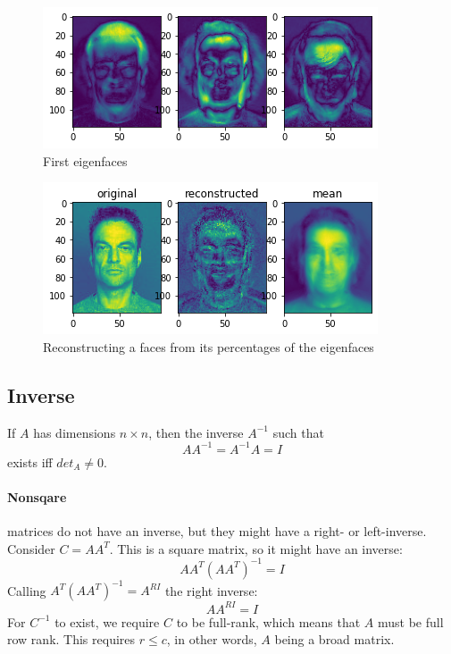 \begin{figure}[H]
    \caption{First eigenfaces}
    \centering
    \includegraphics[width=0.75\linewidth]{images/eigenface1.png}
\end{figure}

\begin{figure}[H]
    \caption{Reconstructing a faces from its percentages of the eigenfaces}
    \centering
    \includegraphics[width=0.75\linewidth]{images/eigenface_reconstructed.png}
\end{figure}







\subsection{Inverse}

If $A$ has dimensions $n \times n$, then the inverse $A^{-1}$ such that
$$ A A^{-1} = A^{-1} A = I $$
exists iff $det_A \neq 0$.

\paragraph{Nonsqare} matrices do not have an inverse, but they might have a right- or left-inverse.
Consider $C = A A^T$. This is a square matrix, so it might have an inverse:
$$ A A^T (A A^T)^{-1} = I $$
Calling $A^T (A A^T)^{-1} = A^{RI}$ the right inverse:
$$ A A^{RI} = I $$
For $C^{-1}$ to exist, we require $C$ to be full-rank, which means that $A$ must be full row rank. This  requires $r \leq c$, in other words, $A$ being a broad matrix.

